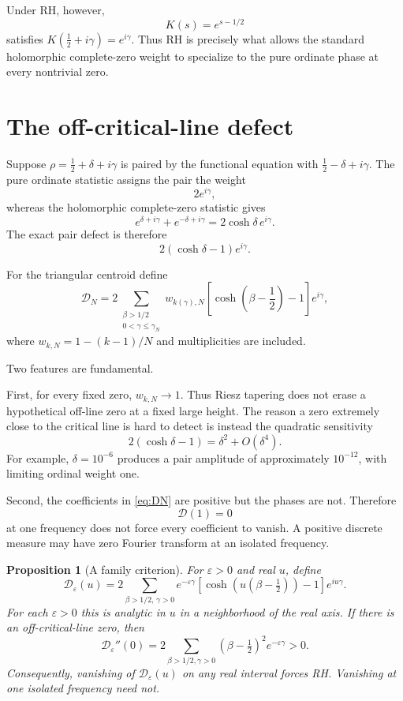 \documentclass[11pt]{amsart}
\numberwithin{equation}{section}
\newtheorem{proposition}[theorem]{Proposition}
\theoremstyle{definition}
\theoremstyle{remark}
\newcommand{\cD}{\mathcal D}
\begin{document}
Under RH, however,
\[
K(s)=e^{s-1/2}
\]
satisfies $K(\tfrac12+i\gamma)=e^{i\gamma}$.  Thus RH is precisely what allows the standard holomorphic complete-zero weight to specialize to the pure ordinate phase at every nontrivial zero.

\section{The off-critical-line defect}\label{sec:defect}

Suppose $\rho=\tfrac12+\delta+i\gamma$ is paired by the functional equation with $\tfrac12-\delta+i\gamma$.  The pure ordinate statistic assigns the pair the weight
\[
2e^{i\gamma},
\]
whereas the holomorphic complete-zero statistic gives
\[
e^{\delta+i\gamma}+e^{-\delta+i\gamma}
=2\cosh\delta\,e^{i\gamma}.
\]
The exact pair defect is therefore
\begin{equation}\label{eq:pairdefect}
2(\cosh\delta-1)e^{i\gamma}.
\end{equation}

For the triangular centroid define
\begin{equation}\label{eq:DN}
\boxed{
\cD_N
=2\sum_{\substack{\beta>1/2\\0<\gamma\le\gamma_N}}
 w_{k(\gamma),N}
\left[\cosh\!\left(\beta-\frac12\right)-1\right]e^{i\gamma},
}
\end{equation}
where $w_{k,N}=1-(k-1)/N$ and multiplicities are included.

Two features are fundamental.

First, for every fixed zero, $w_{k,N}\to1$.  Thus Riesz tapering does not erase a hypothetical off-line zero at a fixed large height.  The reason a zero extremely close to the critical line is hard to detect is instead the quadratic sensitivity
\begin{equation}\label{eq:quadraticdefect}
2(\cosh\delta-1)=\delta^2+O(\delta^4).
\end{equation}
For example, $\delta=10^{-6}$ produces a pair amplitude of approximately $10^{-12}$, with limiting ordinal weight one.

Second, the coefficients in \eqref{eq:DN} are positive but the phases are not.  Therefore
\[
\cD(1)=0
\]
at one frequency does not force every coefficient to vanish.  A positive discrete measure may have zero Fourier transform at an isolated frequency.

\begin{proposition}[A family criterion]\label{prop:familycriterion}
For $\varepsilon>0$ and real $u$, define
\[
\cD_\varepsilon(u)
=2\sum_{\beta>1/2,\,\gamma>0}
 e^{-\varepsilon\gamma}
\left[\cosh\!\left(u(\beta-\tfrac12)\right)-1\right]e^{iu\gamma}.
\]
For each $\varepsilon>0$ this is analytic in $u$ in a neighborhood of the real axis.  If there is an off-critical-line zero, then
\[
\cD_\varepsilon''(0)
=2\sum_{\beta>1/2,\gamma>0}
(\beta-\tfrac12)^2e^{-\varepsilon\gamma}>0.
\]
Consequently, vanishing of $\cD_\varepsilon(u)$ on any real interval forces RH.  Vanishing at one isolated frequency need not.
\end{proposition}
\end{document}
